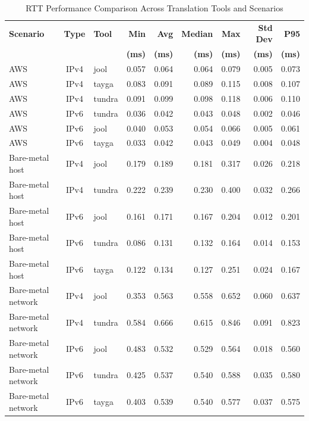 \begin{table}[htbp]
\centering
\caption{RTT Performance Comparison Across Translation Tools and Scenarios}
\label{tab:rtt_comparison}
\footnotesize
\begin{tabular}{|l|c|l|r|r|r|r|r|r|}
\hline
\textbf{Scenario} & \textbf{Type} & \textbf{Tool} & \textbf{Min} & \textbf{Avg} & \textbf{Median} & \textbf{Max} & \textbf{Std Dev} & \textbf{P95}  \\
 & & & \textbf{(ms)} & \textbf{(ms)} & \textbf{(ms)} & \textbf{(ms)} & \textbf{(ms)} & \textbf{(ms)}  \\
\hline
AWS & IPv4 & jool & 0.057 & 0.064 & 0.064 & 0.079 & 0.005 & 0.073   \\
AWS & IPv4 & tayga & 0.083 & 0.091 & 0.089 & 0.115 & 0.008 & 0.107   \\
AWS & IPv4 & tundra & 0.091 & 0.099 & 0.098 & 0.118 & 0.006 & 0.110   \\
AWS & IPv6 & tundra & 0.036 & 0.042 & 0.043 & 0.048 & 0.002 & 0.046   \\
AWS & IPv6 & jool & 0.040 & 0.053 & 0.054 & 0.066 & 0.005 & 0.061   \\
AWS & IPv6 & tayga & 0.033 & 0.042 & 0.043 & 0.049 & 0.004 & 0.048   \\
\hline
Bare-metal host & IPv4 & jool & 0.179 & 0.189 & 0.181 & 0.317 & 0.026 & 0.218   \\
Bare-metal host & IPv4 & tundra & 0.222 & 0.239 & 0.230 & 0.400 & 0.032 & 0.266   \\
Bare-metal host & IPv6 & jool & 0.161 & 0.171 & 0.167 & 0.204 & 0.012 & 0.201   \\
Bare-metal host & IPv6 & tundra & 0.086 & 0.131 & 0.132 & 0.164 & 0.014 & 0.153   \\
Bare-metal host & IPv6 & tayga & 0.122 & 0.134 & 0.127 & 0.251 & 0.024 & 0.167   \\
\hline
Bare-metal network & IPv4 & jool & 0.353 & 0.563 & 0.558 & 0.652 & 0.060 & 0.637   \\
Bare-metal network & IPv4 & tundra & 0.584 & 0.666 & 0.615 & 0.846 & 0.091 & 0.823   \\
Bare-metal network & IPv6 & jool & 0.483 & 0.532 & 0.529 & 0.564 & 0.018 & 0.560   \\
Bare-metal network & IPv6 & tundra & 0.425 & 0.537 & 0.540 & 0.588 & 0.035 & 0.580   \\
Bare-metal network & IPv6 & tayga & 0.403 & 0.539 & 0.540 & 0.577 & 0.037 & 0.575   \\
\hline
\end{tabular}
\end{table}

